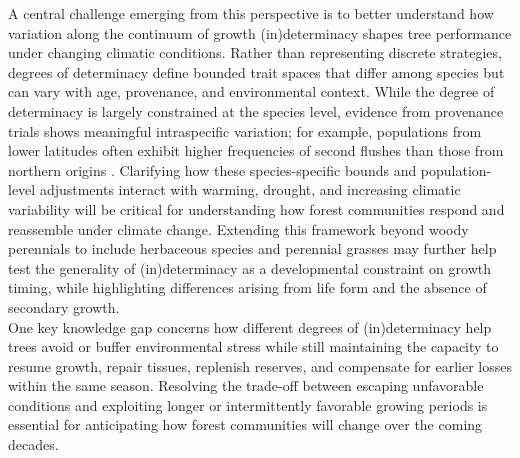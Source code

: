 \documentclass{article}
\begin{document}



A central challenge emerging from this perspective is to better understand how variation along the continuum of growth (in)determinacy shapes tree performance under changing climatic conditions. Rather than representing discrete strategies, degrees of determinacy define bounded trait spaces that differ among species but can vary with age, provenance, and environmental context. While the degree of determinacy is largely constrained at the species level, evidence from provenance trials shows meaningful intraspecific variation; for example, populations from lower latitudes often exhibit higher frequencies of second flushes than those from northern origins \citep{rudolphLammasGrowthProlepsis1964}. Clarifying how these species-specific bounds and population-level adjustments interact with warming, drought, and increasing climatic variability will be critical for understanding how forest communities respond and reassemble under climate change. Extending this framework beyond woody perennials to include herbaceous species and perennial grasses may further help test the generality of (in)determinacy as a developmental constraint on growth timing, while highlighting differences arising from life form and the absence of secondary growth.\\

One key knowledge gap concerns how different degrees of (in)determinacy help trees avoid or buffer environmental stress while still maintaining the capacity to resume growth, repair tissues, replenish reserves, and compensate for earlier losses within the same season. Resolving the trade-off between escaping unfavorable conditions and exploiting longer or intermittently favorable growing periods is essential for anticipating how forest communities will change over the coming decades.\\
\end{document}
